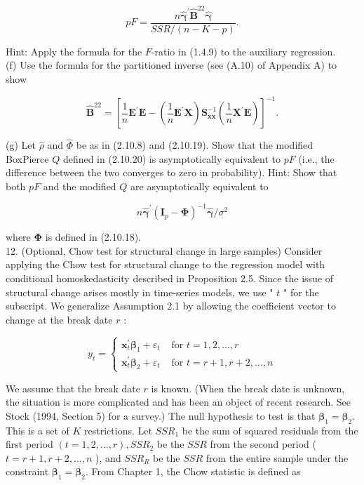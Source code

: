 \documentclass[10pt]{article}
\begin{document}
$$
p F=\frac{n \hat{\boldsymbol{\gamma}}^{\prime} \widehat{\mathbf{B}}^{22} \hat{\boldsymbol{\gamma}}}{S S R /(n-K-p)} .
$$

Hint: Apply the formula for the $F$-ratio in (1.4.9) to the auxiliary regression.\\
(f) Use the formula for the partitioned inverse (see (A.10) of Appendix A) to show

$$
\widehat{\mathbf{B}}^{22}=\left[\frac{1}{n} \mathbf{E}^{\prime} \mathbf{E}-\left(\frac{1}{n} \mathbf{E}^{\prime} \mathbf{X}\right) \mathbf{S}_{\mathbf{x x}}^{-1}\left(\frac{1}{n} \mathbf{X}^{\prime} \mathbf{E}\right)\right]^{-1} .
$$

(g) Let $\hat{\rho}$ and $\widehat{\Phi}$ be as in (2.10.8) and (2.10.19). Show that the modified BoxPierce $Q$ defined in (2.10.20) is asymptotically equivalent to $p F$ (i.e., the difference between the two converges to zero in probability). Hint: Show that both $p F$ and the modified $Q$ are asymptotically equivalent to

$$
n \hat{\boldsymbol{\gamma}}^{\prime}\left(\mathbf{I}_{p}-\boldsymbol{\Phi}\right)^{-1} \hat{\boldsymbol{\gamma}} / \sigma^{2}
$$

where $\boldsymbol{\Phi}$ is defined in (2.10.18).\\
12. (Optional, Chow test for structural change in large samples) Consider applying the Chow test for structural change to the regression model with conditional homoskedasticity described in Proposition 2.5. Since the issue of structural change arises mostly in time-series models, we use " $t$ " for the subscript. We generalize Assumption 2.1 by allowing the coefficient vector to change at the break date $r$ :

$$
y_{t}= \begin{cases}\mathbf{x}_{t}^{\prime} \boldsymbol{\beta}_{1}+\varepsilon_{t} & \text { for } t=1,2, \ldots, r \\ \mathbf{x}_{t}^{\prime} \boldsymbol{\beta}_{2}+\varepsilon_{t} & \text { for } t=r+1, r+2, \ldots, n\end{cases}
$$

We assume that the break date $r$ is known. (When the break date is unknown, the situation is more complicated and has been an object of recent research. See Stock (1994, Section 5) for a survey.) The null hypothesis to test is that $\boldsymbol{\beta}_{1}=\boldsymbol{\beta}_{2}$. This is a set of $K$ restrictions. Let $S S R_{1}$ be the sum of squared residuals from the first period $(t=1,2, \ldots, r), S S R_{2}$ be the $S S R$ from the second period ( $t=r+1, r+2, \ldots, n$ ), and $S S R_{R}$ be the $S S R$ from the entire sample under the constraint $\boldsymbol{\beta}_{1}=\boldsymbol{\beta}_{2}$. From Chapter 1, the Chow statistic is defined as
\end{document}
